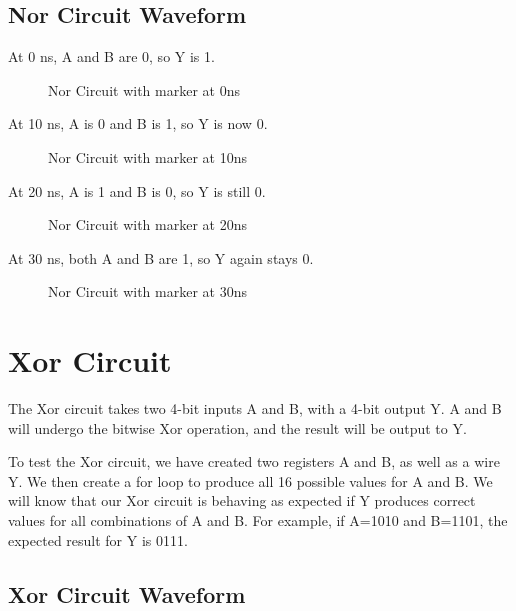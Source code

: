 \documentclass[12pt]{article}
\begin{document}
\subsection{Nor Circuit Waveform}

At 0 ns, A and B are 0, so Y is 1.
\begin{figure}[H]
    \centering
    \caption{Nor Circuit with marker at 0ns}
    \label{fig:enter-label}
\end{figure}

At 10 ns, A is 0 and B is 1, so Y is now 0.
\begin{figure}[H]
    \centering
    \caption{Nor Circuit with marker at 10ns}
    \label{fig:enter-label}
\end{figure}

At 20 ns, A is 1 and B is 0, so Y is still 0.
\begin{figure}[H]
    \centering
    \caption{Nor Circuit with marker at 20ns}
    \label{fig:enter-label}
\end{figure}

At 30 ns, both A and B are 1, so Y again stays 0.
\begin{figure}[H]
    \centering
    \caption{Nor Circuit with marker at 30ns}
    \label{fig:enter-label}
\end{figure}

\section{Xor Circuit}
The Xor circuit takes two 4-bit inputs A and B, with a 4-bit output Y. A and B will undergo the bitwise Xor operation, and the result will be output to Y.
 

To test the Xor circuit, we have created two registers A and B, as well as a wire Y. We then create a for loop to produce all 16 possible values for A and B. We will know that our Xor circuit is behaving as expected if Y produces correct values for all combinations of A and B. For example, if A=1010 and B=1101, the expected result for Y is 0111. 
 

\subsection{Xor Circuit Waveform} 
\end{document}
